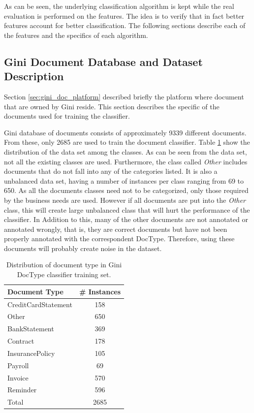 As can be seen, the underlying classification algorithm is kept while the
 real evaluation is performed on  the features. The idea  is to verify
that in fact better features account for better classification. The following
sections describe each of the features and the specifics of each algorithm. 


\subsection{Gini Document Database and Dataset Description}
\label{sec:gini_db_dataset_desc}
  
Section \ref{sec:gini_doc_platform} described briefly the platform where
document that are owned by Gini reside. This section describes the specific of the
documents used for training the classifier. 

Gini database of documents consists of approximately 9339 different documents. From these, only 2685 are used to train the document classifier.
Table \ref{tab:doctype_classifier_classes} show the distribution of the data
set among the classes. As can be seen from the data set, not all the existing
classes are used. Furthermore, the class called \textit{Other} includes
documents that do not fall into any of the categories listed. It is also a
unbalanced data set, having a number of instances per class ranging from 69
to 650. As all the documents classes need not to be categorized,  only those
required by the business needs are used. However if all documents are put
into the \textit{Other} class, this will create large unbalanced class that
will hurt the performance of the classifier. In Addition to this, many of the
other documents are not annotated or annotated wrongly, that is, they are correct documents but have
not been properly annotated with the correspondent \ac{DocType}. Therefore,
using these documents will probably create noise in the dataset.


\begin{table}[h]

  \centering
  \caption{Distribution of document type in  Gini \ac{DocType} classifier training set.}
  \label{tab:doctype_classifier_classes}

\small
\begin{tabular}{|l|c|}
\hline
 \textbf{Document Type}    &  \textbf{\# Instances}  \\
\hline
 CreditCardStatement  &           158  \\
 Other                &           650  \\
 BankStatement        &           369  \\
 Contract             &           178  \\  
 InsurancePolicy      &           105  \\
 Payroll              &            69  \\
 Invoice              &           570  \\
 Reminder             &           596  \\
\hline
 Total                &          2685  \\
\hline
\end{tabular}
\end{table}


